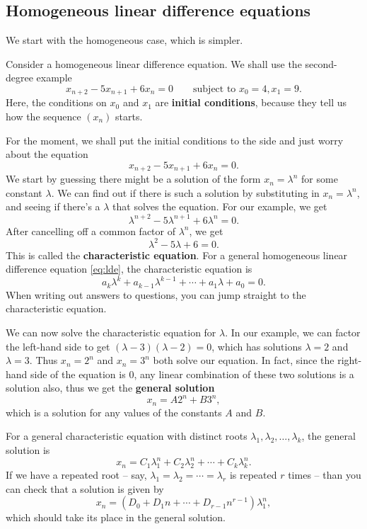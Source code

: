 \documentclass[
  a4paper,
]{article}
\theoremstyle{definition}
\theoremstyle{definition}
\theoremstyle{definition}
\theoremstyle{remark}
\begin{document}
\hypertarget{hom-ldes}{%
\subsection{Homogeneous linear difference equations}\label{hom-ldes}}

We start with the homogeneous case, which is simpler.

Consider a homogeneous linear difference equation. We shall use the second-degree example
\[ x_{n+2} - 5x_{n+1} + 6x_{n} = 0 \qquad \text{subject to } x_0 = 4, x_1 = 9 .  \]
Here, the conditions on \(x_0\) and \(x_1\) are \textbf{initial conditions}, because they tell us how the sequence \((x_n)\) starts.

For the moment, we shall put the initial conditions to the side and just worry about the equation
\[ x_{n+2} - 5x_{n+1} + 6x_{n} = 0 . \]
We start by guessing there might be a solution of the form \(x_n = \lambda^n\) for some constant \(\lambda\). We can find out if there is such a solution by substituting in \(x_n = \lambda^n\), and seeing if there's a \(\lambda\) that solves the equation. For our example, we get
\[ \lambda^{n+2} - 5 \lambda^{n+1} + 6\lambda^n = 0 . \]
After cancelling off a common factor of \(\lambda^n\), we get
\[ \lambda^2 - 5 \lambda + 6 = 0 . \]
This is called the \textbf{characteristic equation}. For a general homogeneous linear difference equation \eqref{eq:lde}, the characteristic equation is
\begin{equation}
  a_k \lambda^{k} + a_{k-1} \lambda^{k-1} + \cdots + a_1 \lambda + a_0 = 0 .  \label{eq:cheq} 
\end{equation}
When writing out answers to questions, you can jump straight to the characteristic equation.

We can now solve the characteristic equation for \(\lambda\). In our example, we can factor the left-hand side to get \((\lambda - 3)(\lambda - 2) = 0\), which has solutions \(\lambda = 2\) and \(\lambda = 3\). Thus \(x_n = 2^n\) and \(x_n = 3^n\) both solve our equation. In fact, since the right-hand side of the equation is \(0\), any linear combination of these two solutions is a solution also, thus we get the \textbf{general solution}
\[ x_n = A 2^n + B 3^n , \]
which is a solution for any values of the constants \(A\) and \(B\).

For a general characteristic equation with distinct roots \(\lambda_1, \lambda_2, \dots, \lambda_k\), the general solution is
\[ x_n = C_1 \lambda_1^n + C_2 \lambda_2^n + \cdots + C_k \lambda_k^n . \]
If we have a repeated root -- say, \(\lambda_1 = \lambda_2 = \cdots = \lambda_r\) is repeated \(r\) times -- than you can check that a solution is given by
\[ x_n = (D_0 + D_1 n + \cdots + D_{r-1} n^{r-1}) \lambda_1^n , \]
which should take its place in the general solution.
\end{document}
